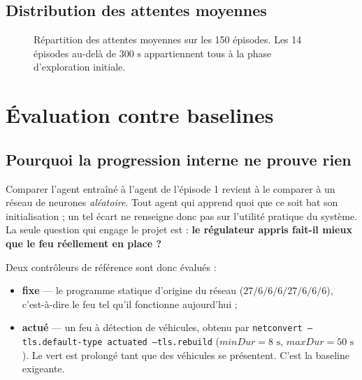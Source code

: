 \documentclass[11pt,a4paper]{article}
\begin{document}
\subsection{Distribution des attentes moyennes}

\begin{figure}[H]
\centering
{}
\caption{Répartition des attentes moyennes sur les 150 épisodes. Les 14 épisodes
au-delà de $300\text{ s}$ appartiennent tous à la phase d'exploration initiale.}
\label{fig:wait_histogram}
\end{figure}

\section{Évaluation contre baselines}

\subsection{Pourquoi la progression interne ne prouve rien}

Comparer l'agent entraîné à l'agent de l'épisode 1 revient à le comparer à un réseau
de neurones \emph{aléatoire}. Tout agent qui apprend quoi que ce soit bat son
initialisation ; un tel écart ne renseigne donc pas sur l'utilité pratique du
système. La seule question qui engage le projet est : \textbf{le régulateur appris
fait-il mieux que le feu réellement en place ?}

Deux contrôleurs de référence sont donc évalués :

\begin{itemize}
  \item \textbf{fixe} --- le programme statique d'origine du réseau
        ($27/6/6/6/27/6/6/6$), c'est-à-dire le feu tel qu'il fonctionne aujourd'hui ;
  \item \textbf{actué} --- un feu à détection de véhicules, obtenu par
        \texttt{netconvert --tls.default-type actuated --tls.rebuild}
        ($minDur = 8\text{ s}$, $maxDur = 50\text{ s}$). Le vert est prolongé tant que
        des véhicules se présentent. C'est la baseline exigeante.
\end{itemize}
\end{document}
